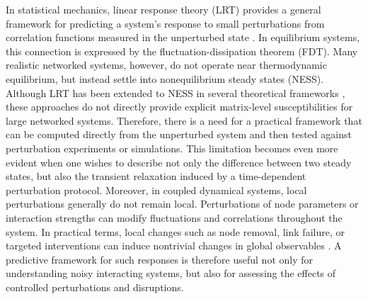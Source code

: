 In statistical mechanics, linear response theory (LRT) provides a general framework for predicting a system's response to small perturbations from correlation functions measured in the unperturbed state \cite{RKubo_1966, 10.1063/5.0003135}. In equilibrium systems, this connection is expressed by the fluctuation-dissipation theorem (FDT). Many realistic networked systems, however, do not operate near thermodynamic equilibrium, but instead settle into nonequilibrium steady states (NESS). Although LRT has been extended to NESS in several theoretical frameworks \cite{Seifert_2010, Mehl_2010, PhysRevLett.117.180601, PhysRevLett.134.157101}, these approaches do not directly provide explicit matrix-level susceptibilities for large networked systems. Therefore, there is a need for a practical framework that can be computed directly from the unperturbed system and then tested against perturbation experiments or simulations. This limitation becomes even more evident when one wishes to describe not only the difference between two steady states, but also the transient relaxation induced by a time-dependent perturbation protocol. Moreover, in coupled dynamical systems, local perturbations generally do not remain local. Perturbations of node parameters or interaction strengths can modify fluctuations and correlations throughout the system. In practical terms, local changes such as node removal, link failure, or targeted interventions can induce nontrivial changes in global observables \cite{NetworkDisruption}. A predictive framework for such responses is therefore useful not only for understanding noisy interacting systems, but also for assessing the effects of controlled perturbations and disruptions.

